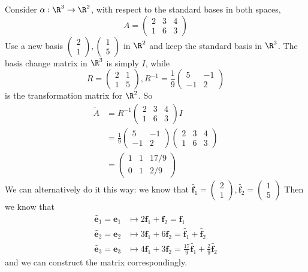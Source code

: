 \documentclass[a4paper]{article}
\begin{document}
\begin{eg}
  Consider $\alpha: \R^3 \to \R^2$, with respect to the standard bases in both spaces,
  \[
    A =
    \begin{pmatrix}
      2 & 3 & 4\\
      1 & 6 & 3
    \end{pmatrix}
  \]
  Use a new basis $
  \begin{pmatrix}
    2\\1
  \end{pmatrix},
  \begin{pmatrix}
    1\\5
  \end{pmatrix}$ in $\R^2$ and keep the standard basis in $\R^3$. The basis change matrix in $\R^3$ is simply $I$, while
  \[
    R =
    \begin{pmatrix}
      2& 1\\
      1 & 5
    \end{pmatrix}, R^{-1} = \frac{1}{9}
    \begin{pmatrix}
      5 & -1\\
      -1 & 2
    \end{pmatrix}
  \]
  is the transformation matrix for $\R^2$. So
  \begin{align*}
    \tilde{A} &= R^{-1}
    \begin{pmatrix}
      2 & 3 & 4\\1 & 6 & 3
    \end{pmatrix}I\\
    &= \frac{1}{9}
    \begin{pmatrix}
      5 & -1\\
      -1 & 2
    \end{pmatrix}
    \begin{pmatrix}
      2 & 3 & 4\\1 & 6 & 3
    \end{pmatrix}\\
    &=
    \begin{pmatrix}
      1 & 1 & 17/9\\
      0 & 1 & 2/9
    \end{pmatrix}
  \end{align*}
  We can alternatively do it this way: we know that $\tilde{\mathbf{f}_1} =
  \begin{pmatrix}
    2\\1
  \end{pmatrix}, \tilde{\mathbf{f}_2} =
  \begin{pmatrix}
    1\\5
  \end{pmatrix}$
  Then we know that
  \begin{align*}
    \tilde{\mathbf{e}_1} = \mathbf{e}_1 &\mapsto 2\mathbf{f}_1 + \mathbf{f}_2 = \mathbf{f}_1\\
    \tilde{\mathbf{e}_2} = \mathbf{e}_2 &\mapsto 3\mathbf{f}_1 + 6\mathbf{f}_2 = \tilde{\mathbf{f}_1} + \tilde{\mathbf{f}_2}\\
    \tilde{\mathbf{e}_3} = \mathbf{e}_3 &\mapsto 4\mathbf{f}_1 + 3\mathbf{f}_2 = \frac{17}{9} \tilde{\mathbf{f}_1} + \frac{2}{9}\tilde{\mathbf{f}_2}
  \end{align*}
  and we can construct the matrix correspondingly.
\end{eg}
\end{document}
